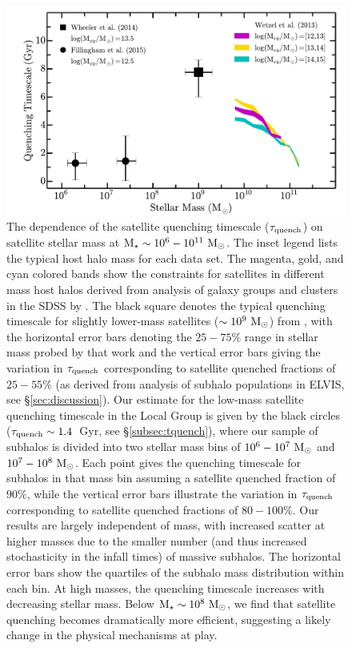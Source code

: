 \begin{figure}
\centering
\hspace*{-0.15in}
\includegraphics[width=6.5in]{tcbflash/f5.pdf}
\caption[Main Result of TCBFlash]{The dependence of the satellite quenching timescale
  ($\tau_{\rm quench}$) on satellite stellar mass at ${\rm M}_{\star} \sim
  10^{6}-10^{11}~{\rm M}_{\odot}$. The inset legend lists the typical host halo
  mass for each data set. The magenta, gold, and cyan colored bands
  show the constraints for satellites in different mass host halos
  derived from analysis of galaxy groups and clusters in the SDSS by
  \citet{wetzel13}. The black square denotes the typical quenching
  timescale for slightly lower-mass satellites ($\sim10^{9}~{\rm M}_{\odot}$)
  from \citet{wheeler14}, with the horizontal error bars denoting the
  $25-75\%$ range in stellar mass probed by that work and the vertical
  error bars giving the variation in $\tau_{\rm quench}$ corresponding
  to satellite quenched fractions of $25-55\%$ (as derived from
  analysis of subhalo populations in ELVIS, see
  \S\ref{sec:discussion}). Our estimate for the low-mass satellite
  quenching timescale in the Local Group is given by the black circles
  ($\tau_{\rm quench} \sim 1.4$~Gyr, see \S\ref{subsec:tquench}),
  where our sample of subhalos is divided into two stellar mass bins
  of $10^{6}-10^{7}~{\rm M}_{\odot}$ and $10^{7}-10^{8}~{\rm M}_{\odot}$. Each point gives
  the quenching timescale for subhalos in that mass bin assuming a
  satellite quenched fraction of $90\%$, while the vertical error bars
  illustrate the variation in $\tau_{\rm quench}$ corresponding to
  satellite quenched fractions of $80-100\%$. Our results are largely
  independent of mass, with increased scatter at higher masses due to
  the smaller number (and thus increased stochasticity in the infall
  times) of massive subhalos. The horizontal error bars show the
  quartiles of the subhalo mass distribution within each bin. At high
  masses, the quenching timescale increases with decreasing stellar
  mass. Below ${\rm M}_{\star}\sim10^{8}~{\rm M}_{\odot}$, we find that
  satellite quenching becomes dramatically more efficient, suggesting
  a likely change in the physical mechanisms at play.}
\label{fig:tquench}
\end{figure}


